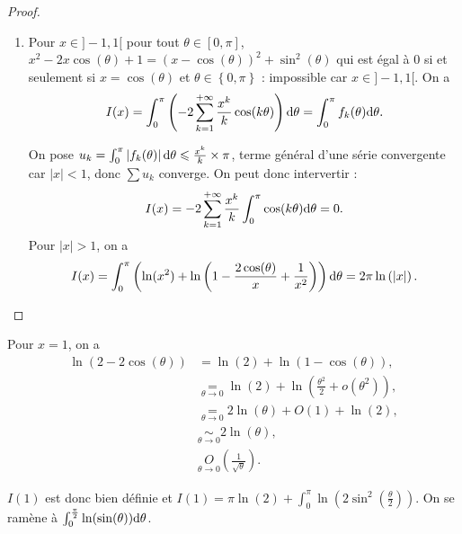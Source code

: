 \documentclass[12pt]{article}
\begin{document}
\begin{proof}
\begin{enumerate}
        \item Pour $x\in]-1,1[$ pour tout $\theta\in[0,\pi]$, $x^{2}-2x\cos(\theta)+1=\left(x-\cos(\theta)\right)^{2}+\sin^{2}(\theta)$ qui est égal à 0 si et seulement si $x=\cos(\theta)$ et $\theta\in\left\lbrace0,\pi\right\rbrace$ : impossible car $x\in]-1,1[$. On a 
        \begin{equation}
            I(x)=\int_{0}^{\pi}\left(-2\sum_{k=1}^{+\infty}\frac{x^{k}}{k}\cos(k\theta)\right)\mathrm{d}\theta=\int_{0}^{\pi}f_k(\theta)\mathrm{d}\theta.
        \end{equation}

        On pose $u_k=\int_{0}^{\pi}\left\lvert f_k(\theta)\right\rvert\mathrm{d}\theta\leqslant\frac{x^{k}}{k}\times\pi$, terme général d'une série convergente car $\left\lvert x\right\rvert<1$, donc $\sum u_{k}$ converge. On peut donc intervertir :
        \begin{equation}
            I(x)=-2\sum_{k=1}^{+\infty}\frac{x^{k}}{k}\int_{0}^{\pi}\cos(k\theta)\mathrm{d}\theta=0.
        \end{equation}
        Pour $\left\lvert x\right\rvert>1$, on a 
        \begin{equation}
            I(x)=\int_{0}^{\pi}\left(\ln(x^{2})+\ln\left(1-\frac{2\cos(\theta)}{x}+\frac{1}{x^{2}}\right)\right)\mathrm{d}\theta=2\pi\ln\left(\left\lvert x\right\rvert\right).
        \end{equation}
    \end{enumerate}
\end{proof}

\begin{remark}
    Pour $x=1$, on a 
    \begin{align}
        \ln(2-2\cos(\theta))
        &=\ln(2)+\ln(1-\cos(\theta)),\\
        &\underset{\theta\to0}{=}\ln(2)+\ln\left(\frac{\theta^{2}}{2}+o(\theta^{2})\right),\\
        &\underset{\theta\to0}{=}2\ln(\theta)+O(1)+\ln(2),\\
        &\underset{\theta\to0}{\sim}2\ln(\theta),\\
        &\underset{\theta\to0}{O}\left(\frac{1}{\sqrt{\theta}}\right).
    \end{align}

    $I(1)$ est donc bien définie et $I(1)=\pi\ln(2)+\int_{0}^{\pi}\ln\left(2\sin^{2}\left(\frac{\theta}{2}\right)\right)$. On se ramène à $\int_{0}^{\frac{\pi}{2}}\ln(\sin(\theta))\mathrm{d}\theta$.
\end{remark}
\end{document}
